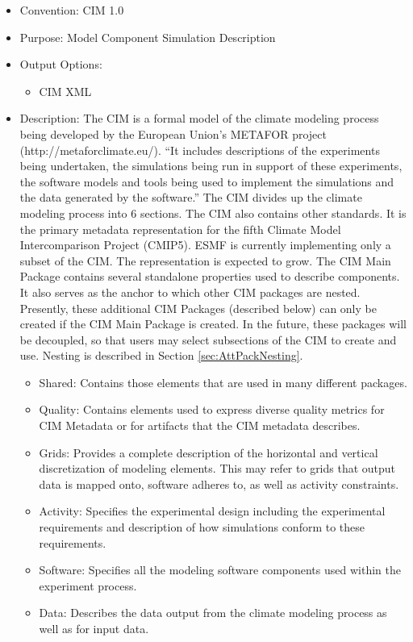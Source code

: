 \begin{itemize}
    \item Convention: CIM 1.0
    \item Purpose: Model Component Simulation Description
    \item Output Options: 
    \begin{itemize}
        \item CIM XML
    \end{itemize}  
    \item Description: The CIM is a formal model of the climate modeling process being developed by the European Union's METAFOR project (http://metaforclimate.eu/). ``It includes descriptions of the experiments being undertaken, the simulations being run in support of these experiments, the software models and tools being used to implement the simulations and the data generated by the software.'' The CIM divides up the climate modeling process into 6 sections. The CIM also contains other standards. It is the primary metadata representation for the fifth Climate Model Intercomparison Project (CMIP5). ESMF is currently implementing only a subset of the CIM. The representation is expected to grow. The CIM Main Package contains several standalone properties used to describe components. It also serves as the anchor to which other CIM packages are nested. Presently, these additional CIM Packages (described below) can only be created if the CIM Main Package is created. In the future, these packages will be decoupled, so that users may select subsections of the CIM to create and use. Nesting is described in Section \ref{sec:AttPackNesting}.
    \begin{itemize}
       \item Shared: Contains those elements that are used in many different packages. 
       \item Quality: Contains elements used to express diverse quality metrics for CIM Metadata or for artifacts that the CIM metadata describes.
       \item Grids: Provides a complete description of the horizontal and vertical discretization of modeling elements. This may refer to grids that output data is mapped onto, software adheres to, as well as activity constraints. 
       \item Activity: Specifies the experimental design including the experimental requirements and description of how simulations conform to these requirements.
       \item Software: Specifies all the modeling software components used within the experiment process. 
       \item Data: Describes the data output from the climate modeling process as well as for input data. 
    \end{itemize}
\end{itemize}

